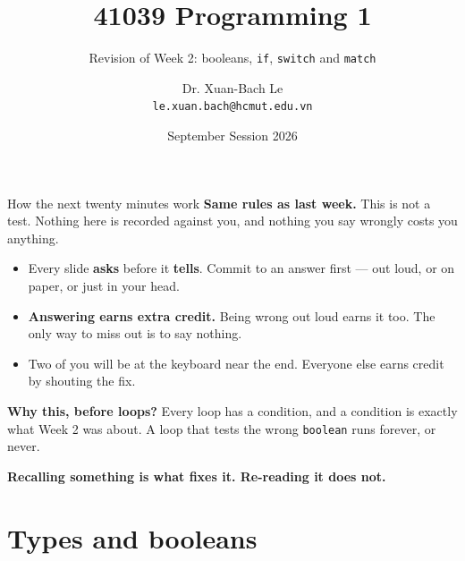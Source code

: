 \documentclass[aspectratio=169]{beamer}
\title[41039 Programming 1 --- Revision of Week 2]{41039 Programming 1}
\subtitle{Revision of Week 2: booleans, \texttt{if}, \texttt{switch} and \texttt{match}}
\author{Dr. Xuan-Bach Le\\ \small\texttt{le.xuan.bach@hcmut.edu.vn}}
\institute{\small Faculty of Computer Science and Engineering, HCMUT}
\date{September Session 2026}
\newcommand{\keyline}[1]{\vfill\begin{center}\textcolor{bkblue}{\textbf{#1}}\end{center}\vspace*{0.2em}}
\newcommand{\hd}[1]{\textbf{#1}}
\newcommand{\code}[1]{\texttt{#1}}
\begin{document}
\begin{frame}[plain]
  \titlepage
\end{frame}

\begin{frame}{How the next twenty minutes work}
  \hd{Same rules as last week.} This is not a test. Nothing here is recorded against you,
  and nothing you say wrongly costs you anything.
  \vspace{0.6em}
  \begin{itemize}
    \item Every slide \textbf{asks} before it \textbf{tells}. Commit to an answer first ---
      out loud, or on paper, or just in your head.
    \item \textbf{Answering earns extra credit.} Being wrong out loud earns it too. The only
      way to miss out is to say nothing.
    \item Two of you will be at the keyboard near the end. Everyone else earns credit by
      shouting the fix.
  \end{itemize}
  \vspace{0.6em}
  \hd{Why this, before loops?} Every loop has a condition, and a condition is exactly what
  Week 2 was about. A loop that tests the wrong \code{boolean} runs forever, or never.
  \keyline{Recalling something is what fixes it. Re-reading it does not.}
\end{frame}

\section{Types and booleans}
\end{document}
